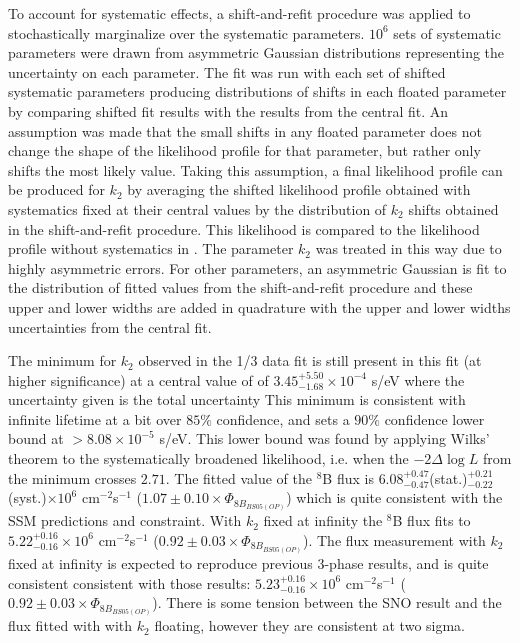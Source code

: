 To account for systematic effects, a shift-and-refit procedure was applied to stochastically marginalize over the systematic parameters.
$10^6$ sets of systematic parameters were drawn from asymmetric Gaussian distributions representing the uncertainty on each parameter. 
The fit was run with each set of shifted systematic parameters producing distributions of shifts in each floated parameter by comparing shifted fit results with the results from the central fit.
An assumption was made that the small shifts in any floated parameter does not change the shape of the likelihood profile for that parameter, but rather only shifts the most likely value. 
Taking this assumption, a final likelihood profile can be produced for $k_2$ by averaging the shifted likelihood profile obtained with systematics fixed at their central values by the distribution of $k_2$ shifts obtained in the shift-and-refit procedure.
This likelihood is compared to the likelihood profile without systematics in .
The parameter $k_2$ was treated in this way due to highly asymmetric errors. 
For other parameters, an asymmetric Gaussian is fit to the distribution of fitted values from the shift-and-refit procedure and these upper and lower widths are added in quadrature with the upper and lower widths uncertainties from the central fit.

The minimum for $k_2$ observed in the 1/3 data fit is still present in this fit (at higher significance) at a central value of of $3.45^{+5.50}_{-1.68}\times10^{-4}$ s/eV where the uncertainty given is the total uncertainty
This minimum is consistent with infinite lifetime at a bit over $85\%$ confidence, and sets a $90\%$ confidence lower bound at $>8.08\times10^{-5}$ s/eV.
This lower bound was found by applying Wilks' theorem to the systematically broadened likelihood, i.e. when the $-2\Delta\log{L}$ from the minimum crosses $2.71$.
The fitted value of the $^8$B flux is $6.08^{+0.47}_{-0.47}$(stat.)$^{+0.21}_{-0.22}$(syst.)$\times10^6$ cm$^{-2}$s$^{-1}$ ($1.07\pm0.10 \times \Phi_{8B_{BS05(OP)}}$) which is quite consistent with the SSM predictions and constraint.
With $k_2$ fixed at infinity the $^8$B flux fits to $5.22^{+0.16}_{-0.16}\times10^6$ cm$^{-2}$s$^{-1}$ ($0.92\pm0.03 \times \Phi_{8B_{BS05(OP)}}$).
The flux measurement with $k_2$ fixed at infinity is expected to reproduce previous 3-phase results, and is quite consistent consistent with those results: $5.23^{+0.16}_{-0.16}\times10^6$ cm$^{-2}$s$^{-1}$ ($0.92\pm0.03 \times \Phi_{8B_{BS05(OP)}}$).
There is some tension between the SNO result and the flux fitted with with $k_2$ floating, however they are consistent at two sigma. 

